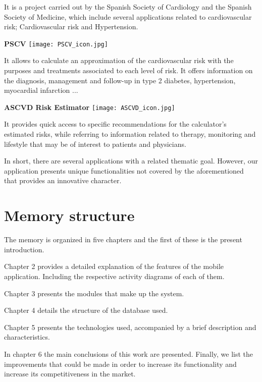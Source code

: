 \documentclass[11pt,spanish,
		listoftables,listoffigures]
		{tfgplantilla}
\begin{document}
\noindent
It is a project carried out by the Spanish Society of Cardiology and the Spanish Society of Medicine, which include several applications related to cardiovascular risk; Cardiovascular risk and Hypertension.

\noindent
\textbf {PSCV}
\texttt{[image: PSCV\_icon.jpg]}

\noindent
It allows to calculate an approximation of the cardiovascular risk with the purposes and treatments associated to each level of risk. It offers information on the diagnosis, management and follow-up in type 2 diabetes, hypertension, myocardial infarction ...

\noindent
\textbf {ASCVD Risk Estimator}
\texttt{[image: ASCVD\_icon.jpg]}

\noindent
It provides quick access to specific recommendations for the calculator's estimated risks, while referring to information related to therapy, monitoring and lifestyle that may be of interest to patients and physicians.

\bigskip

In short, there are several applications with a related thematic goal. However, our application presents unique functionalities not covered by the aforementioned that provides an innovative character. 

\vfill
\section{Memory structure}

The memory is organized in five chapters and the first of these is the present introduction.

Chapter 2 provides a detailed explanation of the features of the mobile application. Including the respective activity diagrams of each of them.

Chapter 3 presents the modules that make up the system.

Chapter 4 details the structure of the database used.

Chapter 5 presents the technologies used, accompanied by a brief description and characteristics.

In chapter 6 the main conclusions of this work are presented. Finally, we list the improvements that could be made in order to increase its functionality and increase its competitiveness in the market.

\end{document}
